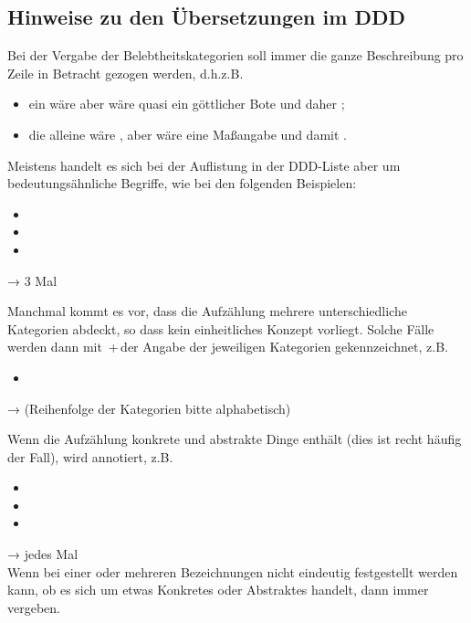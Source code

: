 {\subsection{Hinweise zu den Übersetzungen im DDD}

Bei der Vergabe der Belebtheitskategorien soll immer die ganze Beschreibung pro Zeile in Betracht gezogen werden, d.h.\thinspace{}z.B. 

\begin{itemize}
\item ein  wäre  aber  wäre quasi ein göttlicher Bote und daher ; 
\item die  alleine wäre , aber  wäre eine Maßangabe und damit .
\end{itemize}

Meistens handelt es sich bei der Auflistung in der DDD-Liste aber um bedeutungsähnliche Begriffe, wie bei den folgenden Beispielen:

\begin{itemize}
  \itemsep0pt
\item {}
\item {}
\item {} 
\end{itemize}

→ 3 Mal 

Manchmal kommt es vor, dass die Aufzählung mehrere unterschiedliche Kategorien abdeckt, so dass kein einheitliches Konzept vorliegt. Solche Fälle werden dann mit  \,+\,der Angabe der jeweiligen Kategorien gekennzeichnet, z.B.

\begin{itemize}
\item {}
\end{itemize} 

→  (Reihenfolge der Kategorien bitte alphabetisch)

\noindent 
{} Wenn die Aufzählung konkrete und abstrakte Dinge enthält (dies ist recht häufig der Fall), wird  annotiert, z.B. 

\begin{itemize}
  \itemsep0pt
\item {}
\item {}
\item {}
\end{itemize}
→ jedes Mal  
\\
 Wenn bei einer oder mehreren Bezeichnungen nicht eindeutig festgestellt werden kann, ob es sich um etwas Konkretes oder Abstraktes handelt, dann immer  vergeben. 

}
